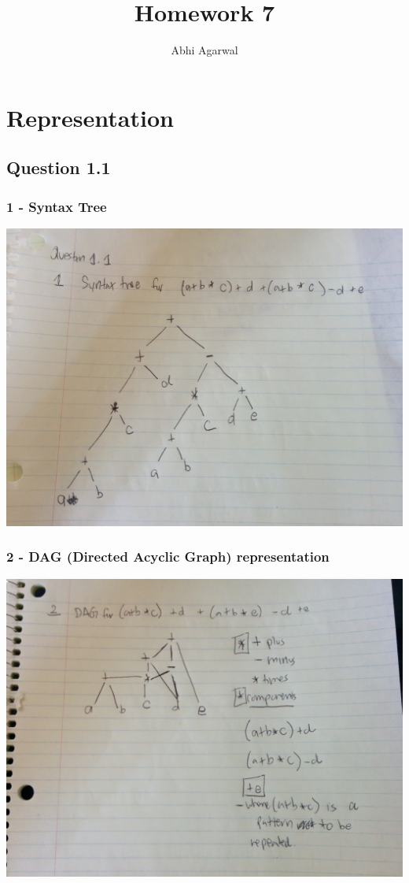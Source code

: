 \documentclass[11pt, oneside]{article}   	%
\title{Homework 7}
\author{Abhi Agarwal}
\date{}
\begin{document}
\maketitle
\section{Representation}
\subsection{Question 1.1}
\subsubsection{1 - Syntax Tree}

\includegraphics[scale=0.15]{IMG_20141025_154037.jpg}

\subsubsection{2 - DAG (Directed Acyclic Graph) representation}

\includegraphics[scale=0.15]{IMG_20141025_154052.jpg}
\end{document}
